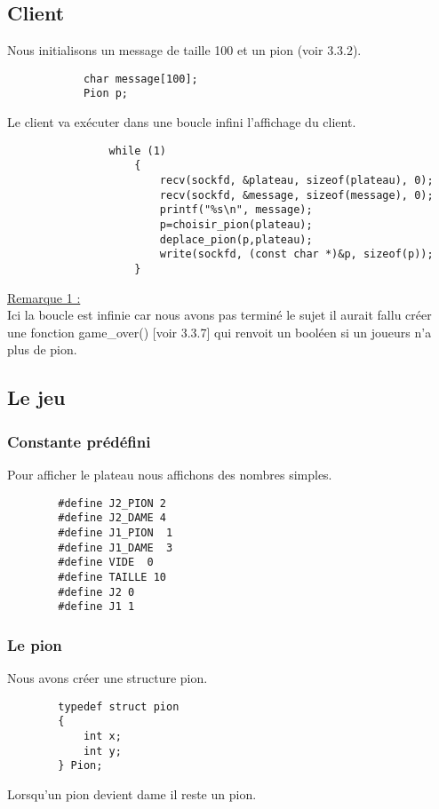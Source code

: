 \documentclass{article}
\begin{document}
    
    \subsection{Client}
        Nous initialisons un message de taille 100 et un pion (voir 3.3.2).
        \begin{lstlisting}
            char message[100];
            Pion p;
        \end{lstlisting}
            Le client va exécuter dans une boucle infini l'affichage du client.
            \begin{lstlisting}
                while (1)
                    {
                        recv(sockfd, &plateau, sizeof(plateau), 0);
                        recv(sockfd, &message, sizeof(message), 0);
                        printf("%s\n", message);
                        p=choisir_pion(plateau);
                        deplace_pion(p,plateau);
                        write(sockfd, (const char *)&p, sizeof(p));
                    }
            \end{lstlisting}
            \underline{Remarque 1 : }  \\ Ici la boucle est infinie car nous avons pas terminé 
            le sujet il aurait fallu créer une fonction game\_over() [voir 3.3.7] qui renvoit un booléen 
            si un joueurs n'a plus de pion.
    \subsection{Le jeu}
    \subsubsection{Constante prédéfini}
    Pour afficher le plateau nous affichons des nombres simples.
    \begin{lstlisting}
        #define J2_PION 2
        #define J2_DAME 4
        #define J1_PION  1
        #define J1_DAME  3
        #define VIDE  0
        #define TAILLE 10
        #define J2 0
        #define J1 1
    \end{lstlisting}
    \subsubsection{Le pion}
    Nous avons créer une structure pion.
    \begin{lstlisting}
        typedef struct pion
        {
            int x;
            int y;
        } Pion;
    \end{lstlisting}
    Lorsqu'un pion devient dame il reste un pion. 
\end{document}
